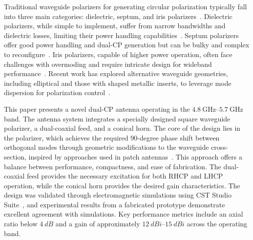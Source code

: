 \documentclass[journal]{IEEEtran}
\newcommand{\frequencyrange}{\qtyrange{4.8}{5.7}{\giga\hertz}}
\begin{document}
Traditional waveguide polarizers for generating circular polarization typically fall into three main categories: dielectric, septum, and iris polarizers~\cite{shuliak-et-al:modern-microwave-polarizers-and-their-electromagnetic-characteristics, arora-et-al:dielectric-polarizer-based-potter-horn-antenna-for-deep-space-on-board-ttc-uplink-applications}. Dielectric polarizers, while simple to implement, suffer from narrow bandwidths and dielectric losses, limiting their power handling capabilities~\cite{melendro-jimenez-et-al:a-novel-logarithmic-spiral-shaped-3d-printed-dielectirc-polarizer-for-dual-circularly-polarized-conical-beam-radiation-patterns-in-the-ka-band}. Septum polarizers offer good power handling and dual-CP generation but can be bulky and complex to reconfigure~\cite{ruiz-cruz-et-al:compact-reconfigurable-waveguide-circular-polarizer, wang-et-al:novel-square-rectangle-waveguide-septum-polarizer}. Iris polarizers, capable of higher power operation, often face challenges with overmoding and require intricate design for wideband performance~\cite{song-et-al:design-of-wideband-quad-ridge-waveguide-polarizer, virone-et-al:optimum-iris-set-concept-for-waveguide-polarizers, piltyay-et-al:new-tunable-iris-post-square-waveguide-polarizers-for-satelliste-information-systems}. Recent work has explored alternative waveguide geometries, including elliptical and those with shaped metallic inserts, to leverage mode dispersion for polarization control~\cite{yu-et-al:a-wideband-circularly-polarized-horn-antenna-with-a-tapered-elliptical-waveguide-polarizer, rud-shpachenko:polarizers-on-sections-of-square-waveguides-with-inner-corner-ridges, bhardwaj-volakis:hexagonal-waveguides-new-class-of-waveguides-for-mmwave-circularly-polarized-horns, bhardwaj-volakis:hexagonal-waveguide-based-circularly-polarized-horn-antennas-for-submmwave-terahertz-band, bhardwaj-volakis:circularly-polarized-horn-antennas-for-terahertz-communications-using-differential-mode-dispersion-in-hexagonal-waveguides, garcia-marin-masa-campos:bowtie-shaped-radiating-element-for-single-and-dual-circular-polarization}.

This paper presents a novel dual-CP antenna operating in the $\frequencyrange$ band. The antenna system integrates a specially designed square waveguide polarizer, a dual-coaxial feed, and a conical horn. The core of the design lies in the polarizer, which achieves the required 90-degree phase shift between orthogonal modes through geometric modifications to the waveguide cross-section, inspired by approaches used in patch antennas~\cite{armin-et-al:modification-of-a-2g2hz-sband-rectangular-patch-microstrip-antenna-using-truncated-corner-method-for-satellite-applications}. This approach offers a balance between performance, compactness, and ease of fabrication. The dual-coaxial feed provides the necessary excitation for both RHCP and LHCP operation, while the conical horn provides the desired gain characteristics. The design was validated through electromagnetic simulations using CST Studio Suite~\cite{cst}, and experimental results from a fabricated prototype demonstrate excellent agreement with simulations. Key performance metrics include an axial ratio below $\qty{4}{dB}$ and a gain of approximately $\qtyrange{12}{15}{dBi}$ across the operating band.
\end{document}
